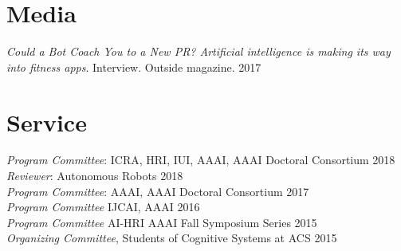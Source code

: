 \documentclass[margin,line,11pt]{res}
\begin{document}
\begin{resume}
\section{\sc Media}
\emph{Could a Bot Coach You to a New PR? Artificial intelligence is making its way into fitness apps}. Interview. Outside magazine. \hfill 2017


\section{\sc Service}
\emph{Program Committee}: ICRA, HRI, IUI, AAAI, AAAI Doctoral Consortium \hfill 2018\\
\emph{Reviewer}: Autonomous  Robots \hfill 2018\\
\emph{Program Committee}: AAAI, AAAI Doctoral Consortium \hfill 2017\\
\emph{Program Committee} IJCAI, AAAI \hfill 2016\\
\emph{Program Committee} AI-HRI AAAI Fall Symposium Series \hfill 2015\\
\emph{Organizing Committee}, Students of Cognitive Systems at ACS \hfill 2015\\












\end{resume}
\end{document}
